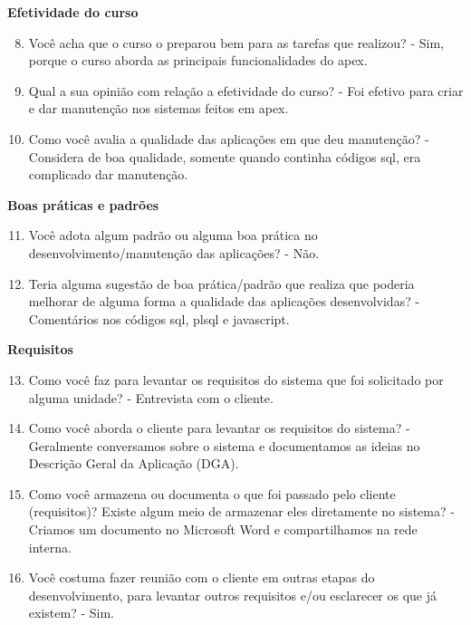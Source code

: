 \begin{anexosenv}
\textbf{Efetividade do curso}

\begin{enumerate}
\setcounter{enumi}{7}
\item Você acha que o curso o preparou bem para as tarefas que realizou?\newline
- Sim, porque o curso aborda as principais funcionalidades do apex.
\item Qual a sua opinião com relação a efetividade do curso?\newline
- Foi efetivo para criar e dar manutenção nos sistemas feitos em apex.
\item Como você avalia a qualidade das aplicações em que deu manutenção?\newline
- Considera de boa qualidade, somente quando continha códigos sql, era complicado dar manutenção.
\end{enumerate}

\textbf{Boas práticas e padrões}

\begin{enumerate}
\setcounter{enumi}{10}
\item Você adota algum padrão ou alguma boa prática no desenvolvimento/manutenção das
aplicações?\newline
- Não.
\item Teria alguma sugestão de boa prática/padrão que realiza que poderia melhorar de
alguma forma a qualidade das aplicações desenvolvidas?\newline
- Comentários nos códigos sql, plsql e javascript.
\end{enumerate}

\textbf{Requisitos}

\begin{enumerate}
\setcounter{enumi}{12}
\item Como você faz para levantar os requisitos do sistema que foi solicitado por alguma
unidade?\newline
- Entrevista com o cliente.
\item Como você aborda o cliente para levantar os requisitos do sistema?\newline
- Geralmente conversamos sobre o sistema e documentamos as ideias no Descrição Geral da Aplicação (DGA).
\item Como você armazena ou documenta o que foi passado pelo cliente (requisitos)? Existe
algum meio de armazenar eles diretamente no sistema?\newline
- Criamos um documento no Microsoft Word e compartilhamos na rede interna.
\item Você costuma fazer reunião com o cliente em outras etapas do desenvolvimento, para
levantar outros requisitos e/ou esclarecer os que já existem?\newline
- Sim.
\end{enumerate}


\end{anexosenv}
